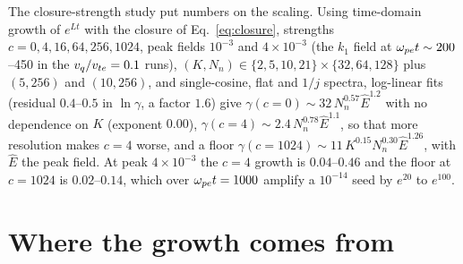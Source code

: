 \begin{table}[t]
\caption{Largest real part of the frozen-field spectrum for the AW and SW bases (peak field $E_1$, Fourier cut-off $K$, Hermite order $N_n$) and Floquet exponent in a pump-modulated field (\texttt{studies/highk/}). The SW values are round-off at every point tested.}\label{tab:aw}
\small
{}
\end{table}

The closure-strength study put numbers on the scaling. Using time-domain growth of $e^{Lt}$ with the closure of Eq.~\eqref{eq:closure}, strengths $c=0,4,16,64,256,1024$, peak fields $10^{-3}$ and $4\times10^{-3}$ (the $k_1$ field at $\omega_{pe} t\sim200$--450 in the $v_q/v_{te}=0.1$ runs), $(K,N_n)\in\{2,5,10,21\}\times\{32,64,128\}$ plus $(5,256)$ and $(10,256)$, and single-cosine, flat and $1/j$ spectra, log-linear fits (residual $0.4$--$0.5$ in $\ln\gamma$, a factor $1.6$) give $\gamma(c=0)\sim32\,N_n^{0.57}\hat E^{1.2}$ with no dependence on $K$ (exponent $0.00$), $\gamma(c=4)\sim2.4\,N_n^{0.78}\hat E^{1.1}$, so that more resolution makes $c=4$ worse, and a floor $\gamma(c=1024)\sim11\,K^{0.15}N_n^{0.30}\hat E^{1.26}$, with $\hat E$ the peak field. At peak $4\times10^{-3}$ the $c=4$ growth is $0.04$--$0.46$ and the floor at $c=1024$ is $0.02$--$0.14$, which over $\omega_{pe} t=1000$ amplify a $10^{-14}$ seed by $e^{20}$ to $e^{100}$.

\section{Where the growth comes from}\label{sec:mechanism}

